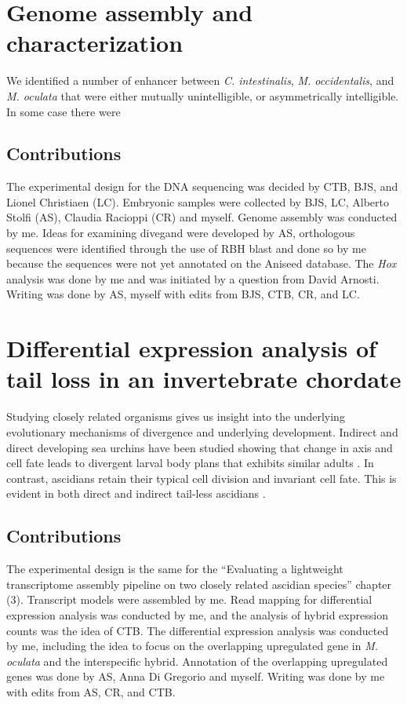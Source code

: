 \section{Genome assembly and characterization}
We identified a number of enhancer between \textit{C. intestinalis}, \textit{M. occidentalis}, and \textit{M. oculata} that were either mutually unintelligible, or asymmetrically intelligible. In some case there were 

\subsection{Contributions}
The experimental design for the DNA sequencing was decided by CTB, BJS, and Lionel Christiaen (LC). Embryonic samples were collected by BJS, LC, Alberto Stolfi (AS), Claudia Racioppi (CR) and myself. Genome assembly was conducted by me. Ideas for examining divegand were developed by AS, orthologous sequences were identified through the use of RBH blast and done so by me because the sequences were not yet annotated on the Aniseed database. The \textit{Hox} analysis was done by me and was initiated by a question from David Arnosti. Writing was done by AS, myself with edits from BJS, CTB, CR, and LC.

\section{Differential expression analysis of tail loss in an invertebrate chordate}
Studying closely related organisms gives us insight into the underlying evolutionary mechanisms of divergence and underlying development. Indirect and direct developing sea urchins have been studied showing that change in axis and cell fate leads to divergent larval body plans that exhibits similar adults \cite{wray_evolutionary_1989,henry_evolutionary_1990}. In contrast, ascidians retain their typical cell division and invariant cell fate. This is evident in both direct and indirect tail-less ascidians \cite{jeffery_evolutionary_1991,maliska_molgula_2010}. 
\subsection{Contributions}
The experimental design is the same for the ``Evaluating a lightweight transcriptome assembly pipeline on two closely related ascidian species'' chapter (3). Transcript models were assembled by me. Read mapping for differential expression analysis was conducted by me, and the analysis of hybrid expression counts was the idea of CTB. The differential expression analysis was conducted by me, including the idea to focus on the overlapping upregulated gene in \textit{M. oculata} and the interspecific hybrid. Annotation of the overlapping upregulated genes was done by AS, Anna Di Gregorio and myself. Writing was done by me with edits from AS, CR, and CTB.
  
